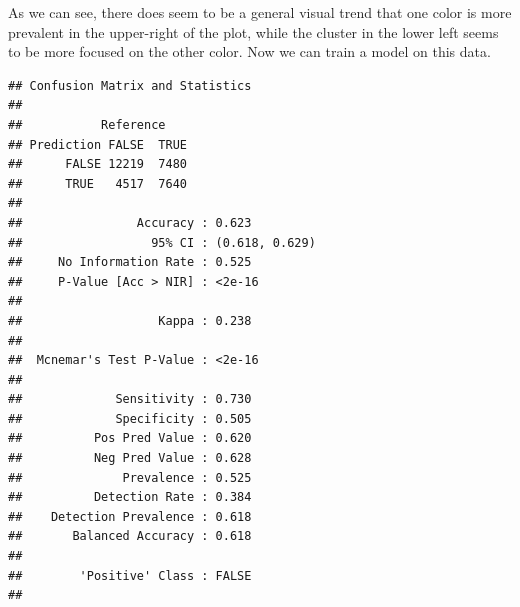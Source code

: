 \documentclass[
]{article}
\newenvironment{Shaded}{\begin{snugshade}}{\end{snugshade}}
\newcommand{\AttributeTok}[1]{\textcolor[rgb]{0.77,0.63,0.00}{#1}}
\newcommand{\CommentTok}[1]{\textcolor[rgb]{0.56,0.35,0.01}{\textit{#1}}}
\newcommand{\FunctionTok}[1]{\textcolor[rgb]{0.00,0.00,0.00}{#1}}
\newcommand{\NormalTok}[1]{#1}
\newcommand{\OtherTok}[1]{\textcolor[rgb]{0.56,0.35,0.01}{#1}}
\newcommand{\SpecialCharTok}[1]{\textcolor[rgb]{0.00,0.00,0.00}{#1}}
\begin{document}
As we can see, there does seem to be a general visual trend that one
color is more prevalent in the upper-right of the plot, while the
cluster in the lower left seems to be more focused on the other color.
Now we can train a model on this data.

\begin{Shaded}
\end{Shaded}

\begin{verbatim}
## Confusion Matrix and Statistics
## 
##           Reference
## Prediction FALSE  TRUE
##      FALSE 12219  7480
##      TRUE   4517  7640
##                                         
##                Accuracy : 0.623         
##                  95% CI : (0.618, 0.629)
##     No Information Rate : 0.525         
##     P-Value [Acc > NIR] : <2e-16        
##                                         
##                   Kappa : 0.238         
##                                         
##  Mcnemar's Test P-Value : <2e-16        
##                                         
##             Sensitivity : 0.730         
##             Specificity : 0.505         
##          Pos Pred Value : 0.620         
##          Neg Pred Value : 0.628         
##              Prevalence : 0.525         
##          Detection Rate : 0.384         
##    Detection Prevalence : 0.618         
##       Balanced Accuracy : 0.618         
##                                         
##        'Positive' Class : FALSE         
## 
\end{verbatim}
\end{document}

